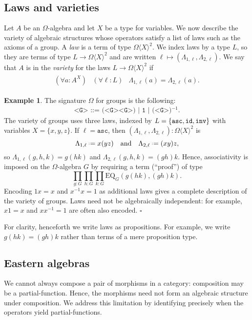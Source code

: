 \documentclass{amsart}
\newcommand{\tin}{:}
\numberwithin{lstfloat}{section}
\newcommand{\Free}[2]{#1\langle #2\rangle}
\newcommand{\type}[1]{#1}
\newcommand{\defeq}{\mathrel{\hstretch{.13}{=}\hspace{.2ex}{=}}}
\newcommand{\exqed}{\hfill $\square$}
\theoremstyle{definition}
\newtheorem{ex}[thm]{Example}
\theoremstyle{remark}
\numberwithin{equation}{section}
\begin{document}
\subsection{Laws and varieties}\label{sec_laws}

Let ${\type{A}}$ be an $\Omega$-algebra and let $X$ be a type for variables. We
now describe the variety of algebraic structures whose operators satisfy a list
of laws such as the axioms of a group. A \emph{law} is a term of
type $\Free{\Omega}{X}^2$. We index laws by a type $L$, so they
are terms of type $L \to \Omega\langle X\rangle^2$ and are written $\ell \mapsto
(\Lambda_{1,\ell}, \Lambda_{2,\ell})$. We say that ${\type{A}}$ is
in the \emph{variety} for the laws $L \to \Omega\langle
X\rangle^2$ if 
\begin{align*}
\begin{array}{lll}
  (\forall a\tin {\type{A}}^X)& (\forall \ell\tin {L})& \Lambda_{1,\ell}(a) = \Lambda_{2,\ell}(a).
\end{array}
\end{align*}


\begin{ex}\label{ex:group-grammar}
  The signature $\Omega$ for groups is the following:
  \begin{align*}
    \texttt{<G> ::= (<G><G>) | 1 | (<G>)$^{-1}$}  .
  \end{align*}
  The variety of groups uses three laws, indexed by 
  $L=\{{\tt asc}, {\tt id}, {\tt inv}\}$ with variables $X=\{x,y,z\}$. 
  If $\ell = \texttt{asc}$, then $(\Lambda_{1,\ell}, \Lambda_{2, \ell}) : \Omega\langle X\rangle^2$ is 
  \[ 
    \Lambda_{1,\ell} \defeq x(yz) \quad \text{and} \quad \Lambda_{2, \ell} \defeq (xy)z,
  \] 
  so $\Lambda_{1,\ell}(g,h,k)=g(hk)$ and $\Lambda_{2,\ell}(g,h,k)=(gh)k$.
  Hence, associativity is imposed on the $\Omega$-algebra $G$ by requiring a term (``proof'') 
  of type
  \[ 
    \prod_{g:G}\prod_{h:G}\prod_{k:G} 
    \text{EQ}_G ( g(hk), (gh)k).
  \] 
  Encoding $1x=x$ and $x^{-1} x=1$ as additional laws 
  gives a complete description of the variety of groups.  
  Laws need not be algebraically independent:  for example, 
  $x1=x$ and $xx^{-1}=1$ are often also encoded. 
  \exqed 
\end{ex}
For clarity, henceforth we write laws as propositions.  For example, we write
$g(hk)=(gh)k$ rather than  terms of a mere proposition type.

\subsection{Eastern algebras}\label{sec:Eastern-algebras} We cannot always
compose a pair of morphisms in a category: composition may be a
partial-function. Hence, the morphisms need not form an algebraic structure
under composition. We address this limitation by identifying precisely when the
operators yield partial-functions. 
\end{document}
